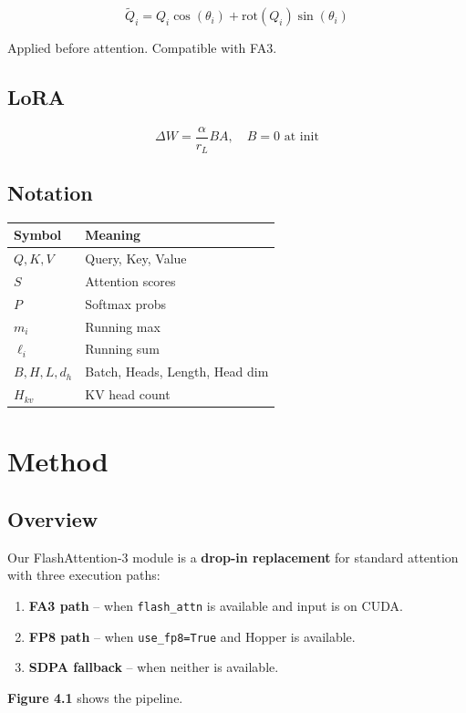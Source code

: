 \[
\tilde{Q}_i = Q_i \cos(\theta_i) + \text{rot}(Q_i) \sin(\theta_i)
\tag{3.7}
\]

Applied before attention. Compatible with FA3.

\subsection{LoRA}

\[
\Delta W = \frac{\alpha}{r_L} B A, \quad B = 0 \text{ at init}
\tag{3.8}
\]

\subsection{Notation}

\begin{table}[H]
\centering
\small
\begin{tabular}{ll}
\toprule
\textbf{Symbol} & \textbf{Meaning} \\
\midrule
$Q, K, V$ & Query, Key, Value \\
$S$ & Attention scores \\
$P$ & Softmax probs \\
$m_i$ & Running max \\
$\ell_i$ & Running sum \\
$B, H, L, d_h$ & Batch, Heads, Length, Head dim \\
$H_{kv}$ & KV head count \\
\bottomrule
\end{tabular}
\end{table}



\section{Method}

\subsection{Overview}

Our FlashAttention-3 module is a \textbf{drop-in replacement} for standard 
attention with three execution paths:

\begin{enumerate}
\item \textbf{FA3 path} -- when \texttt{flash\_attn} is available and input is on CUDA.
\item \textbf{FP8 path} -- when \texttt{use\_fp8=True} and Hopper is available.
\item \textbf{SDPA fallback} -- when neither is available.

\end{enumerate}
\textbf{Figure 4.1} shows the pipeline.

